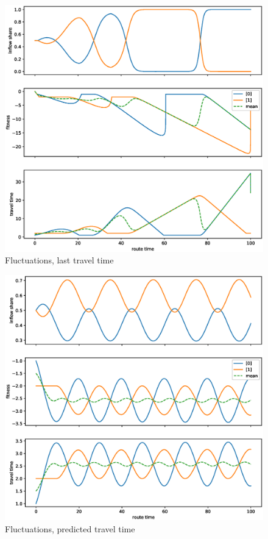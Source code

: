 \documentclass[12pt]{article}
\begin{document}
\begin{center}
	\begin{figure}
	\includegraphics[scale=0.5]{img/replicator_last_tt.eps}
	\caption{Fluctuations, last travel time }
	\label{fig:fluctuations_last}

	\end{figure}
	
\end{center}

\begin{center}
	\begin{figure}
	\includegraphics[scale=0.5]{img/replicator_pred_tt.eps}
	\caption{Fluctuations, predicted travel time }
	\label{fig:fluctuations_pred}

	\end{figure}
	
\end{center}
\end{document}
